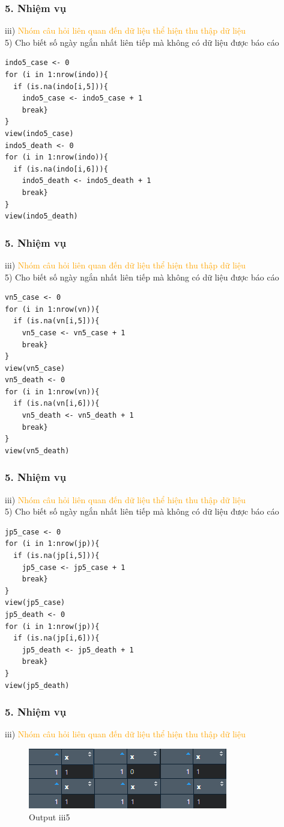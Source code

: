 \documentclass[english,10pt,table]{beamer}
\begin{document}
\begin{frame}[fragile]
\frametitle{5.  Nhiệm vụ}
	iii) \textcolor{orange}{Nhóm câu hỏi liên quan đến dữ liệu thể hiện thu thập dữ liệu}\\%
	5) Cho biết số ngày ngắn nhất liên tiếp mà không có dữ liệu được báo cáo
     \begin{lstlisting}[frame=single]  
indo5_case <- 0
for (i in 1:nrow(indo)){
  if (is.na(indo[i,5])){
    indo5_case <- indo5_case + 1
    break}
}
view(indo5_case)
indo5_death <- 0
for (i in 1:nrow(indo)){
  if (is.na(indo[i,6])){
    indo5_death <- indo5_death + 1
    break}
}
view(indo5_death)
	\end{lstlisting}
\end{frame}

\begin{frame}[fragile]
\frametitle{5.  Nhiệm vụ}
	iii) \textcolor{orange}{Nhóm câu hỏi liên quan đến dữ liệu thể hiện thu thập dữ liệu}\\%
	5) Cho biết số ngày ngắn nhất liên tiếp mà không có dữ liệu được báo cáo
     \begin{lstlisting}[frame=single]  
vn5_case <- 0
for (i in 1:nrow(vn)){
  if (is.na(vn[i,5])){
    vn5_case <- vn5_case + 1
    break}
}
view(vn5_case)
vn5_death <- 0
for (i in 1:nrow(vn)){
  if (is.na(vn[i,6])){
    vn5_death <- vn5_death + 1
    break}
}
view(vn5_death)
	\end{lstlisting}
\end{frame}

\begin{frame}[fragile]
\frametitle{5.  Nhiệm vụ}
	iii) \textcolor{orange}{Nhóm câu hỏi liên quan đến dữ liệu thể hiện thu thập dữ liệu}\\%
	5) Cho biết số ngày ngắn nhất liên tiếp mà không có dữ liệu được báo cáo
     \begin{lstlisting}[frame=single]  
jp5_case <- 0
for (i in 1:nrow(jp)){
  if (is.na(jp[i,5])){
    jp5_case <- jp5_case + 1
    break}
}
view(jp5_case)
jp5_death <- 0
for (i in 1:nrow(jp)){
  if (is.na(jp[i,6])){
    jp5_death <- jp5_death + 1
    break}
}
view(jp5_death)
	\end{lstlisting}
\end{frame}

\begin{frame}[fragile]
\frametitle{5.  Nhiệm vụ}
	iii) \textcolor{orange}{Nhóm câu hỏi liên quan đến dữ liệu thể hiện thu thập dữ liệu}\\%
	\begin{figure}[h!]
	\begin{center}
		    \includegraphics[scale = 1]{Images/III/iii5.png}
		     \caption{Output iii5}
		\end{center}
		\end{figure}
\end{frame}
\end{document}
